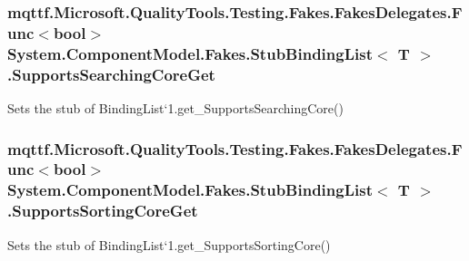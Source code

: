 \hypertarget{class_system_1_1_component_model_1_1_fakes_1_1_stub_binding_list_3_01_t_01_4_a6e99b8983f31c609be1c9bfff221576a}{
\subsubsection[{Supports\-Searching\-Core\-Get}]{\setlength{\rightskip}{0pt plus 5cm}mqttf.\-Microsoft.\-Quality\-Tools.\-Testing.\-Fakes.\-Fakes\-Delegates.\-Func$<$bool$>$ System.\-Component\-Model.\-Fakes.\-Stub\-Binding\-List$<$ T $>$.Supports\-Searching\-Core\-Get}}\label{class_system_1_1_component_model_1_1_fakes_1_1_stub_binding_list_3_01_t_01_4_a6e99b8983f31c609be1c9bfff221576a}


Sets the stub of Binding\-List`1.get\-\_\-\-Supports\-Searching\-Core()

\hypertarget{class_system_1_1_component_model_1_1_fakes_1_1_stub_binding_list_3_01_t_01_4_a26e80504a925c7d8cb410b8ef59c50c0}{
\subsubsection[{Supports\-Sorting\-Core\-Get}]{\setlength{\rightskip}{0pt plus 5cm}mqttf.\-Microsoft.\-Quality\-Tools.\-Testing.\-Fakes.\-Fakes\-Delegates.\-Func$<$bool$>$ System.\-Component\-Model.\-Fakes.\-Stub\-Binding\-List$<$ T $>$.Supports\-Sorting\-Core\-Get}}\label{class_system_1_1_component_model_1_1_fakes_1_1_stub_binding_list_3_01_t_01_4_a26e80504a925c7d8cb410b8ef59c50c0}


Sets the stub of Binding\-List`1.get\-\_\-\-Supports\-Sorting\-Core()



